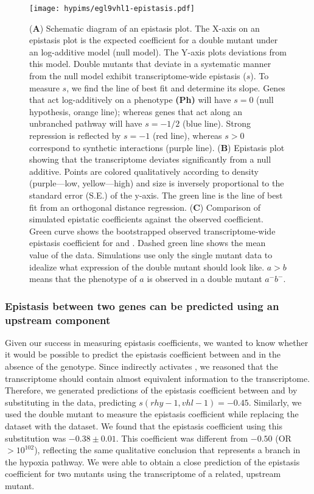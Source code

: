 \begin{figure}[tbhp]
  \centering
  \texttt{[image: hypims/egl9vhl1-epistasis.pdf]}
  \caption{
    (\textbf{A}) Schematic diagram of an epistasis plot. The X-axis on an
    epistasis plot is the expected coefficient for a double mutant under an
    log-additive model (null model). The Y-axis plots deviations from this
    model. Double mutants that deviate in a systematic manner from the null
    model exhibit transcriptome-wide epistasis ($s$). To measure $s$, we find
    the line of best fit and determine its slope. Genes that act log-additively
    on a phenotype \textbf{(Ph)} will have $s=0$ (null hypothesis, orange line);
    whereas genes that act along an unbranched pathway will have $s=-1/2$ (blue
    line). Strong repression is reflected by $s=-1$ (red line), whereas $s>0$
    correspond to synthetic interactions (purple line). (\textbf{B}) Epistasis
    plot showing that the \eglvhl{} transcriptome deviates significantly from a
    null additive. Points are colored qualitatively according to density
    (purple---low, yellow---high) and size is inversely proportional to the
    standard error (S.E.) of the y-axis. The green line is the line of best fit
    from an orthogonal distance regression. (\textbf{C}) Comparison of simulated
    epistatic coefficients against the observed coefficient. Green curve shows
    the bootstrapped observed transcriptome-wide epistasis coefficient for
     and . Dashed green line shows the mean value of the
    data. Simulations use only the single mutant data to idealize what
    expression of the double mutant should look like. $a > b$ means that the
    phenotype of $a$ is observed in a double mutant $a^-b^-$. }
\label{fig:egl9epistasis}
\end{figure}

\subsubsection*{Epistasis between two genes can be predicted using an upstream component}
Given our success in measuring epistasis coefficients, we wanted to know whether
it would be possible to predict the epistasis coefficient between 
and  in the absence of the \egl{} genotype. Since \rhyp{} indirectly
activates \eglp{}, we reasoned that the \rhy{} transcriptome should contain
almost equivalent information to the \egl{} transcriptome. Therefore, we
generated predictions of the epistasis coefficient between  and
 by substituting in the \rhy{} data, predicting $s({rhy-1,vhl-1}) =
-0.45$. Similarly, we used the \eglvhl{} double mutant to measure the epistasis
coefficient while replacing the \egl{} dataset with the \rhy{} dataset. We found
that the epistasis coefficient using this substitution was $-0.38\pm 0.01$. This
coefficient was different from $-0.50$ (OR $>10^{102}$), reflecting the same
qualitative conclusion that  represents a branch in the hypoxia
pathway. We were able to obtain a close prediction of the epistasis coefficient
for two mutants using the transcriptome of a related, upstream mutant.

